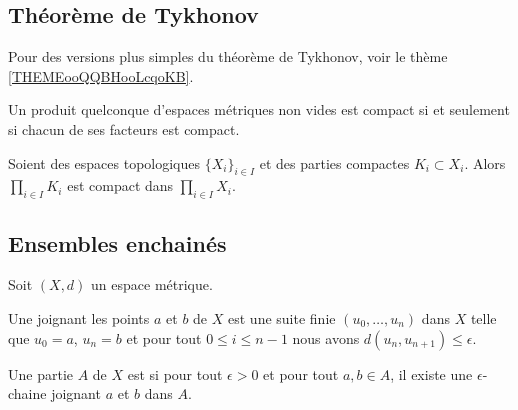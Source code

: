 \subsection{Théorème de Tykhonov}

Pour des versions plus simples du théorème de Tykhonov, voir le thème \ref{THEMEooQQBHooLcqoKB}.
\begin{theorem}[Tykhonov]\label{ThoFWXsQOZ}
	Un produit quelconque d'espaces métriques non vides est compact si et seulement si chacun de ses facteurs est compact.
\end{theorem}

\begin{proposition}	\label{PROPooDXUIooUUmgYN}
	Soient des espaces topologiques \( \{ X_i \}_{i\in I}\) et des parties compactes \( K_i\subset X_i\). Alors \( \prod_{i\in I}K_i\) est compact dans \( \prod_{i\in I}X_i\).
\end{proposition}


\subsection{Ensembles enchainés}

Soit \( (X,d)\) un espace métrique.
\begin{definition}
	Une  joignant les points \( a\) et \( b\) de \( X\) est une suite finie \( (u_0,\ldots, u_n)\) dans \( X\) telle que \( u_0=a\), \( u_n=b\) et pour tout \( 0\leq i\leq n-1\) nous avons \( d(u_n,u_{n+1})\leq \epsilon\).

	Une partie \( A\) de \( X\) est  si pour tout \( \epsilon>0\) et pour tout \( a,b\in A\), il existe une \( \epsilon\)-chaine joignant \( a\) et \( b\) dans \( A\).
\end{definition}



